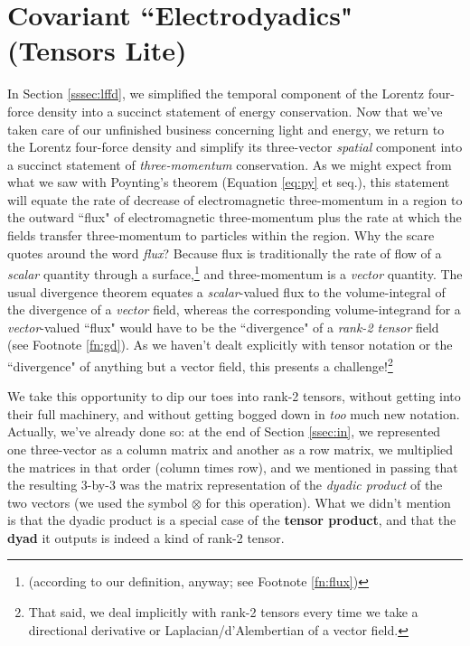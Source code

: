 \documentclass[12pt]{article}
\begin{document}
\section[Covariant “Electrodyadics” (Tensors Lite)]{Covariant ``Electrodyadics" (Tensors Lite)}\label{sec:dy}

In Section \ref{sssec:lffd}, we simplified the temporal component of the Lorentz four-force density into a succinct statement of energy conservation. Now that we've taken care of our unfinished business concerning light and energy, we return to the Lorentz four-force density and simplify its three-vector \emph{spatial} component into a succinct statement of \emph{three-momentum} conservation. As we might expect from what we saw with Poynting's theorem (Equation \ref{eq:py} et seq.), this statement will equate the rate of decrease of electromagnetic three-momentum in a region to the outward ``flux" of electromagnetic three-momentum plus the rate at which the fields transfer three-momentum to particles within the region. Why the scare quotes around the word \emph{flux}? Because flux is traditionally the rate of flow of a \emph{scalar} quantity through a surface,\footnote{(according to our definition, anyway; see Footnote \ref{fn:flux})} and three-momentum is a \emph{vector} quantity. The usual divergence theorem equates a \emph{scalar}-valued flux to the volume-integral of the divergence of a \emph{vector} field, whereas the corresponding volume-integrand for a \emph{vector}-valued ``flux" would have to be the ``divergence" of a \emph{rank-2 tensor} field (see Footnote \ref{fn:gd}). As we haven't dealt explicitly with tensor notation or the ``divergence" of anything but a vector field, this presents a challenge!\footnote{That said, we deal implicitly with rank-2 tensors every time we take a directional derivative or Laplacian/d'Alembertian of a vector field.}

We take this opportunity to dip our toes into rank-2 tensors, without getting into their full machinery, and without getting bogged down in \emph{too} much new notation. Actually, we've already done so: at the end of Section \ref{ssec:in}, we represented one three-vector as a column matrix and another as a row matrix, we multiplied the matrices in that order (column times row), and we mentioned in passing that the resulting 3-by-3 was the matrix representation of the \emph{dyadic product} of the two vectors (we used the symbol $\otimes$ for this operation). What we didn't mention is that the dyadic product is a special case of the \textbf{tensor product}, and that the \textbf{dyad} it outputs is indeed a kind of rank-2 tensor.
\end{document}
